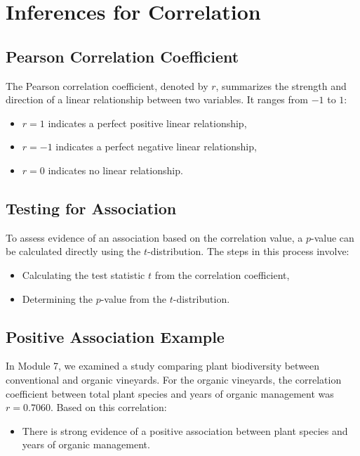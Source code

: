 \documentclass{article}
\begin{document}
\section{Inferences for Correlation}

\subsection{Pearson Correlation Coefficient}
The Pearson correlation coefficient, denoted by \( r \), summarizes the strength and direction of a linear relationship between two variables. It ranges from \(-1\) to \(1\):
\begin{itemize}
    \item \( r = 1 \) indicates a perfect positive linear relationship,
    \item \( r = -1 \) indicates a perfect negative linear relationship,
    \item \( r = 0 \) indicates no linear relationship.
\end{itemize}

\subsection{Testing for Association}
To assess evidence of an association based on the correlation value, a \( p \)-value can be calculated directly using the \( t \)-distribution. The steps in this process involve:
\begin{itemize}
    \item Calculating the test statistic \( t \) from the correlation coefficient,
    \item Determining the \( p \)-value from the \( t \)-distribution.
\end{itemize}

\subsection{Positive Association Example}
In Module 7, we examined a study comparing plant biodiversity between conventional and organic vineyards. For the organic vineyards, the correlation coefficient between total plant species and years of organic management was \( r = 0.7060 \). Based on this correlation:
\begin{itemize}
    \item There is strong evidence of a positive association between plant species and years of organic management.
\end{itemize}
\end{document}
